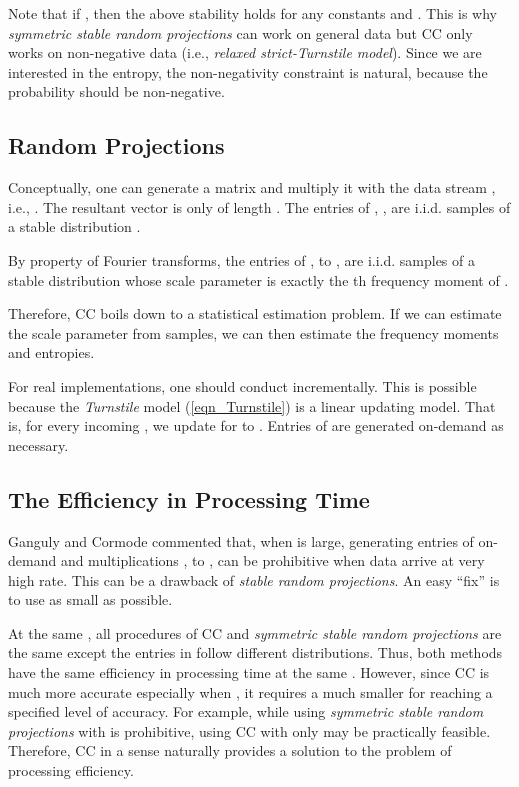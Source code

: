 \documentclass{sig-alternate}
\begin{document}
Note that if , then the above stability holds for any constants  and . This is why {\em symmetric stable random projections}\cite{Article:Indyk_JACM06,Proc:Li_SODA08} can work on general data but CC only works on non-negative data  (i.e., {\em relaxed strict-Turnstile model}). Since we are interested in the entropy, the non-negativity constraint is natural, because the probability should be non-negative.

\subsection{Random Projections}

Conceptually, one can generate a  matrix  and multiply it with the data stream , i.e., . The resultant vector  is only of length . The entries of , ,  are i.i.d. samples of a stable distribution .

By property of Fourier transforms, the entries of ,   to ,  are i.i.d. samples of a stable distribution
{\small}
\noindent whose scale parameter  is exactly the th frequency moment of .

Therefore, CC boils down to a statistical estimation problem. If we can estimate the scale parameter from  samples, we can then estimate the frequency moments and  entropies.

For real implementations, one should conduct  incrementally. This is possible because the {\em Turnstile} model (\ref{eqn_Turnstile}) is  a linear updating model. That is, for every incoming , we update  for  to .  Entries of  are generated on-demand as necessary.

\subsection{The Efficiency in Processing Time}

Ganguly and Cormode \cite{Proc:Ganguly_RANDOM07} commented that, when  is large, generating entries of  on-demand and multiplications ,  to , can be prohibitive when  data arrive at very high rate.  This can be a drawback of {\em stable random projections}. An easy ``fix'' is to use  as small as possible.

At the same , all procedures of CC and {\em symmetric stable random projections} are the same except the entries in  follow different distributions. Thus, both methods have the same efficiency in processing time at the same . However, since CC is much more accurate especially when , it requires a much smaller   for reaching a specified level of accuracy. For example, while using {\em symmetric stable random projections} with  is prohibitive, using CC with  only may be practically feasible.  Therefore, CC in a sense naturally provides a solution to the problem of processing efficiency. 
\end{document}
